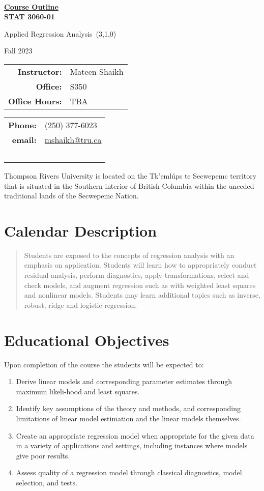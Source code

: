 \documentclass[10pt]{trumathoutline}
\makeatletter
\newcommand{\instructorname}     {Mateen Shaikh}
\newcommand{\instructorphone}    {(250) 377-6023}
\newcommand{\instructoremail}    {mshaikh@tru.ca}
\newcommand{\instructorofficehrs}{TBA}
\newcommand{\instructorofficerm} {S350}
\newcommand{\coursecode}     	 {STAT 3060-01}
\newcommand{\coursetitle}    	 {Applied Regression Analysis}
\newcommand{\coursevectoring}	 {(3,1,0)}
\newcommand{\term}           	 {Fall 2023}
\newcommand{\calendardescription}{
	Students are exposed to the concepts of regression analysis with an emphasis on application. Students will learn how to appropriately conduct residual analysis, perform diagnostics, apply transformations, select and check models, and augment regression such as with weighted least squares and nonlinear models. Students may learn additional topics such as inverse, robust, ridge and logistic regression.
}
\newcommand{\coursedescription}{
}
\newcommand{\courseobjectives}{
	\begin{enumerate}
		\item Derive linear models and corresponding parameter estimates through maximum likeli-hood and least squares.
		\item 	Identify key assumptions of the theory and methods, and corresponding limitations of linear model estimation and the linear models themselves.
		\item	Create an appropriate regression model when appropriate for the given data in a variety of applications and settings, including instances where models give poor results.
		\item	Assess quality of a regression model through classical diagnostics, model selection, and tests.
	\end{enumerate}
}
\makeatother
\begin{document}
	
	~
	
	\vspace{-1em}
	
	\begin{center}
		\bfseries
		{\Large \underline{Course Outline}}\\[0.5em]
		
		\coursecode
		
		\coursetitle\ \coursevectoring
		
		\term
		
	\end{center}
\begin{tabular}{ r l}
	\textbf{Instructor:}	& \instructorname 	\\
	\textbf{Office:} 		& \instructorofficerm \\
	\textbf{Office Hours:} 	& \instructorofficehrs
\end{tabular}\hfill
\begin{tabular}{ r l}
	 \textbf{Phone:} & \instructorphone\\
	 \textbf{email:} & \href{mailto:\instructoremail}{\instructoremail}\\
	~
\end{tabular}

\vspace{1em}


Thompson Rivers University is located on the Tk’eml\'ups te Secwepemc territory that is situated in the Southern interior of British Columbia within the unceded traditional lands of the Secwepemc Nation.

\section*{Calendar Description}
\begin{quote}
	\calendardescription
\end{quote}
	


\section*{Educational Objectives}
Upon completion of the course the students will be expected to:
\courseobjectives
\end{document}
